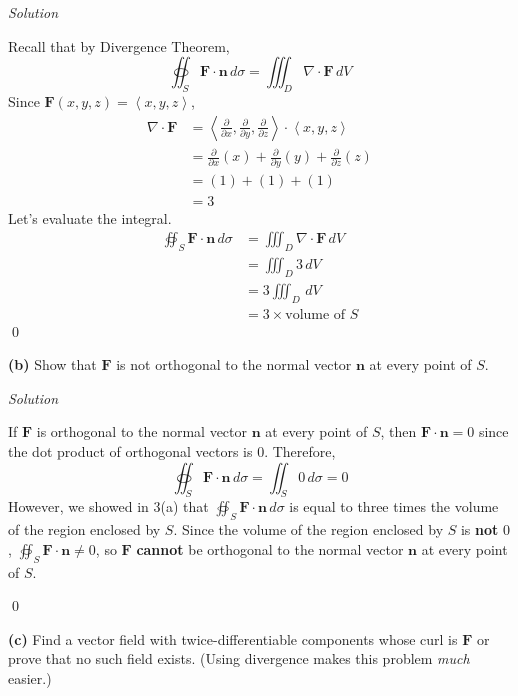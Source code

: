 \documentclass{article}
\newcommand{\lrp}[1]{\left( #1 \right)}
\newcommand{\lra}[1]{\left\langle #1 \right\rangle}
\newcommand{\F}[0]{\mathbf{F}}
\newcommand{\n}[0]{{\mathbf{n}}}
\newcommand{\Solution}{\textit{Solution}}
\begin{document}
\Solution

Recall that by Divergence Theorem,
\begin{equation*}
    \oiint_S \F\cdot \n \,d\sigma = \iiint_D \nabla \cdot \F\,dV
\end{equation*}
Since $\F(x,y,z)=\lra{x,y,z}$,
\begin{align*}
    \nabla \cdot \F&=\lra{\frac{\partial }{\partial x},\frac{\partial }{\partial y},\frac{\partial }{\partial z}}\cdot \lra{x,y,z}\\
    &=\frac{\partial}{\partial x}\lrp{x}+\frac{\partial}{\partial y}\lrp{y}+\frac{\partial}{\partial z}\lrp{z}\\
    &= \lrp{1}+\lrp{1}+\lrp{1}\\
    &=3
\end{align*}
Let's evaluate the integral.
\begin{align*}
    \oiint_S \F\cdot \n \,d\sigma&=\iiint_D \nabla \cdot \F\,dV\\ &=\iiint_D 3\,dV\\
    &=3\iiint_D \,dV\tag{we can take constants out}\\
    &=3\times\text{volume of $S$}\tag{$\displaystyle \iiint_D \,dV$ is volume of region enclosed by $S$}
\end{align*}
\qed

{}\textbf{(b)} Show that $\F$ is not orthogonal to the normal vector $\n$ at every point of $S$.

\Solution

If $\F$ is orthogonal to the normal vector $\n$ at every point of $S$, then $\F\cdot\n=0$ since the dot product of orthogonal vectors is $0$. Therefore, 
\begin{equation*}
    \oiint_S \F\cdot\n\,d\sigma = \iint_S 0\,d\sigma =0\tag{integral of $0$ is $0$}
\end{equation*}
However, we showed in 3(a) that $\displaystyle\oiint_S\F\cdot\n\,d\sigma$ is equal to three times the volume of the region enclosed by $S$. Since the volume of the region enclosed by $S$ is \textbf{not} $0$, $\displaystyle \oiint_S \F\cdot \n \neq 0$, so $\F$ \textbf{cannot} be orthogonal to the normal vector $\n$ at every point of $S$.

\qed

\textbf{(c)} Find a vector field with twice-differentiable components whose curl is $\F$ or prove
that no such field exists. (Using divergence makes this problem \textit{much} easier.)
\end{document}
